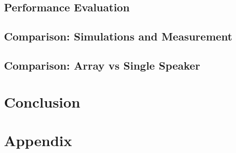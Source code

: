 	\chapter{Performance Evaluation}
	\chapter{Comparison: Simulations and Measurement}
	\chapter{Comparison: Array vs Single Speaker}


 
\part{Conclusion}\label{pt:conclusion}
% 
%

\glsresetall
\appendix %

 \graphicspath{{figures/appendix/}}
\part{Appendix}\label{pt:appendix}










